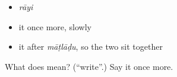 \begin{itemize}
\raggedright
  \item \emph{rāyi}
  \item it once more, slowly
  \item it after \emph{māṭlāḍu}, so the two sit together
\end{itemize}

\begin{tcolorbox}[breakable,colback=teal!4,colframe=teal!35!black,title={Before you move on}]
What does  mean? (\textquotedblleft{}write\textquotedblright{}.) Say it once more.
\end{tcolorbox}
